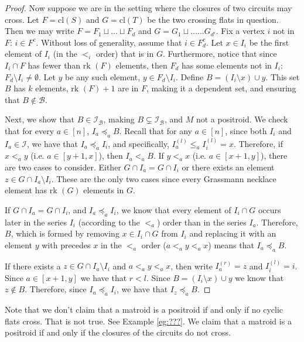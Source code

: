 \documentclass[11pt]{article}
\newcommand{\sanote}{\todo[color=violet!30]}
\newcommand{\rk}{\textrm{rk }}
\newcommand{\cl}{\textrm{cl}}
\newcommand{\cI}{\mathcal{I}}
\newcommand{\cB}{\mathcal{B}}
\theoremstyle{remark}
\theoremstyle{definition}
\begin{document}
\begin{proof}
Now suppose we are in the setting where the closures of two circuits may cross. Let $F = \cl(S)$ and $G = \cl(T)$ be the two crossing flats in question. Then we may write $F = F_1 \sqcup \ldots \sqcup F_d$ and $G = G_1 \sqcup \ldots \ldots G_{d'}$. Fix a vertex $i$ not in $F$: $i \in F^c$. Without loss of generality, assume that $i \in F^c_d$. Let $x \in I_i$ be the first element of $I_i$ (in the $<_i$ order) that is in $G$. Furthermore, notice that since $I_i \cap F$ has fewer than $\rk(F)$ elements, then $F_d$ has some elements not in $I_i$: $F_d \setminus I_i\neq \emptyset$. Let $y$ be any such element, $y \in F_d \setminus I_i$. Define $B = (I_i \setminus x) \cup y$. This set $B$ has $k$ elements, $\rk(F)+1$ are in $F$, making it a dependent set, and ensuring that $B \not \in \cB$.

Next, we show that $B \in \cI_\cB$, making $B \subsetneq \cI_\cB$, and $M$ not a positroid. We check that for every $a \in [n]$, $I_a \preceq_a B$. Recall that for any $a \in [n]$, since both $I_i$ and $I_a \in \cI$, we have that $I_a \preceq_a I_i$, and specifically, $I_a^{(l)} \leq_a I_i^{(l)}= x$. Therefore, if $x <_a y$ (i.e. $a \in [y+1, x]$), then $I_a <_a B$. If $y <_a x$ (i.e. $a \in [x+1, y]$), there are two cases to consider. Either $G\cap I_a = G \cap I_i$ or there exists an element $z \in G \cap I_a \setminus I_i$. These are the only two cases since every Grassmann necklace element has $\rk(G)$ elements in $G$. 

If $G\cap I_a = G \cap I_i$, and $I_a \preceq_a I_i$, we know that every element of $I_i\cap G$ occurs later in the series $I_i$ (according to the $<_a$) order than in the series $I_a$. Therefore, $B$, which is formed by removing $x \in I_i \cap G$ from $I_i$ and replacing it with an element $y$ with precedes $x$ in the $<_a$ order ($a <_a y <_a x$) means that $I_a \preceq_a B$.

If there exists a $z \in G \cap I_a \setminus I_i$ and $a <_a y <_a x$, then write $I_a^{(r)} = z$ and $I_i^{(l)} = i$. Since $a \in [x+1, y]$ we have that $r < l$. Since $B = (I_i \setminus x) \cup y$ we know that $z \not \in B$. Therefore, since $I_a \preceq_a I_i$, we have that $I_z \preceq_a B$.

\end{proof}

Note that we don't claim that a matroid is a positroid if and only if no cyclic flats cross. That is not true. See Example \ref{eg:???}. We claim that a matroid is a positroid if and only if the closures of the circuits do not cross. \sanote{write an example here}



\end{document}
